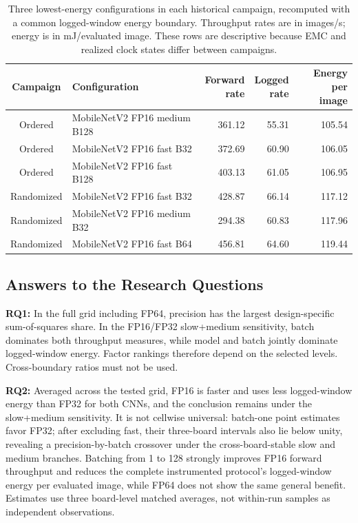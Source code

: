 \documentclass[electronics,article,submit,pdftex,moreauthors]{Definitions/mdpi}
\newcommand{\mobile}{MobileNetV2}
\begin{document}
\begin{table}[t]
\caption{Three lowest-energy configurations in each historical campaign, recomputed with a common logged-window energy boundary. Throughput rates are in images/s; energy is in mJ/evaluated image. These rows are descriptive because EMC and realized clock states differ between campaigns.}
\label{tab:historical}
\centering
\small
\begin{tabular}{clrrr}
\toprule
Campaign & Configuration & \shortstack{Forward\\rate} & \shortstack{Logged\\rate} & \shortstack{Energy per\\image} \\
\midrule
Ordered & \mobile{} FP16 medium B128 & 361.12 & 55.31 & 105.54 \\
Ordered & \mobile{} FP16 fast B32 & 372.69 & 60.90 & 106.05 \\
Ordered & \mobile{} FP16 fast B128 & 403.13 & 61.05 & 106.95 \\
Randomized & \mobile{} FP16 fast B32 & 428.87 & 66.14 & 117.12 \\
Randomized & \mobile{} FP16 medium B32 & 294.38 & 60.83 & 117.96 \\
Randomized & \mobile{} FP16 fast B64 & 456.81 & 64.60 & 119.44 \\
\bottomrule
\end{tabular}
\end{table}

\subsection{Answers to the Research Questions}

\textbf{RQ1:} In the full grid including FP64, precision has the largest design-specific sum-of-squares share. In the FP16/FP32 slow+medium sensitivity, batch dominates both throughput measures, while model and batch jointly dominate logged-window energy. Factor rankings therefore depend on the selected levels. Cross-boundary ratios must not be used.

\textbf{RQ2:} Averaged across the tested grid, FP16 is faster and uses less logged-window energy than FP32 for both CNNs, and the conclusion remains under the slow+medium sensitivity. It is not cellwise universal: batch-one point estimates favor FP32; after excluding fast, their three-board intervals also lie below unity, revealing a precision-by-batch crossover under the cross-board-stable slow and medium branches. Batching from 1 to 128 strongly improves FP16 forward throughput and reduces the complete instrumented protocol's logged-window energy per evaluated image, while FP64 does not show the same general benefit. Estimates use three board-level matched averages, not within-run samples as independent observations.
\end{document}
